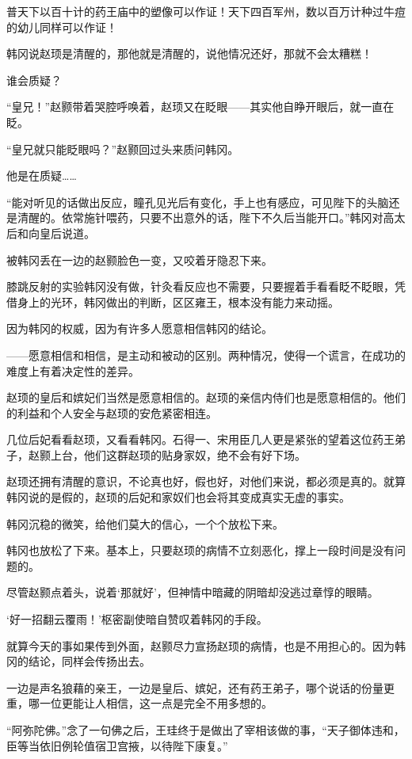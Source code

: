 普天下以百十计的药王庙中的塑像可以作证！天下四百军州，数以百万计种过牛痘的幼儿同样可以作证！

韩冈说赵顼是清醒的，那他就是清醒的，说他情况还好，那就不会太糟糕！

谁会质疑？

“皇兄！”赵颢带着哭腔呼唤着，赵顼又在眨眼——其实他自睁开眼后，就一直在眨。

“皇兄就只能眨眼吗？”赵颢回过头来质问韩冈。

他是在质疑……

“能对听见的话做出反应，瞳孔见光后有变化，手上也有感应，可见陛下的头脑还是清醒的。依常施针喂药，只要不出意外的话，陛下不久后当能开口。”韩冈对高太后和向皇后说道。

被韩冈丢在一边的赵颢脸色一变，又咬着牙隐忍下来。

膝跳反射的实验韩冈没有做，针灸看反应也不需要，只要握着手看看眨不眨眼，凭借身上的光环，韩冈做出的判断，区区雍王，根本没有能力来动摇。

因为韩冈的权威，因为有许多人愿意相信韩冈的结论。

——愿意相信和相信，是主动和被动的区别。两种情况，使得一个谎言，在成功的难度上有着决定性的差异。

赵顼的皇后和嫔妃们当然是愿意相信的。赵顼的亲信内侍们也是愿意相信的。他们的利益和个人安全与赵顼的安危紧密相连。

几位后妃看看赵顼，又看看韩冈。石得一、宋用臣几人更是紧张的望着这位药王弟子，赵颢上台，他们这群赵顼的贴身家奴，绝不会有好下场。

赵顼还拥有清醒的意识，不论真也好，假也好，对他们来说，都必须是真的。就算韩冈说的是假的，赵顼的后妃和家奴们也会将其变成真实无虚的事实。

韩冈沉稳的微笑，给他们莫大的信心，一个个放松下来。

韩冈也放松了下来。基本上，只要赵顼的病情不立刻恶化，撑上一段时间是没有问题的。

尽管赵颢点着头，说着‘那就好’，但神情中暗藏的阴暗却没逃过章惇的眼睛。

‘好一招翻云覆雨！’枢密副使暗自赞叹着韩冈的手段。

就算今天的事如果传到外面，赵颢尽力宣扬赵顼的病情，也是不用担心的。因为韩冈的结论，同样会传扬出去。

一边是声名狼藉的亲王，一边是皇后、嫔妃，还有药王弟子，哪个说话的份量更重，哪一位更能让人相信，这一点是完全不用多想的。

“阿弥陀佛。”念了一句佛之后，王珪终于是做出了宰相该做的事，“天子御体违和，臣等当依旧例轮值宿卫宫掖，以待陛下康复。”

